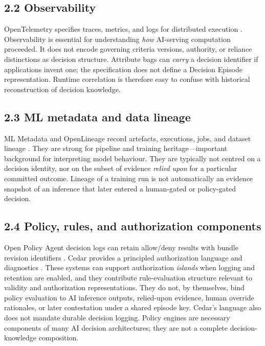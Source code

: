 \documentclass[11pt,a4paper]{article}
\begin{document}
\subsection{2.2 Observability}

OpenTelemetry specifies traces, metrics, and logs for distributed execution \citep{openTelemetry2026specification}. Observability is essential for understanding \emph{how} AI-serving computation proceeded. It does not encode governing criteria versions, authority, or reliance distinctions as decision structure. Attribute bags can \emph{carry} a decision identifier if applications invent one; the specification does not define a Decision Episode representation. Runtime correlation is therefore easy to confuse with historical reconstruction of decision knowledge.


\subsection{2.3 ML metadata and data lineage}

ML Metadata and OpenLineage record artefacts, executions, jobs, and dataset lineage \citep{google2026mlMetadata,openLineage2026specification}. They are strong for pipeline and training heritage---important background for interpreting model behaviour. They are typically not centred on a decision identity, nor on the subset of evidence \emph{relied upon} for a particular committed outcome. Lineage of a training run is not automatically an evidence snapshot of an inference that later entered a human-gated or policy-gated decision.


\subsection{2.4 Policy, rules, and authorization components}

Open Policy Agent decision logs can retain allow/deny results with bundle revision identifiers \citep{openPolicyAgent2026}. Cedar provides a principled authorization language and diagnostics \citep{cedarPolicyLanguage2026}. These systems can support authorization \emph{islands} when logging and retention are enabled, and they contribute rule-evaluation structure relevant to validity and authorization representations. They do not, by themselves, bind policy evaluation to AI inference outputs, relied-upon evidence, human override rationales, or later contestation under a shared episode key. Cedar's language also does not mandate durable decision logging. Policy engines are necessary components of many AI decision architectures; they are not a complete decision-knowledge composition.
\end{document}
